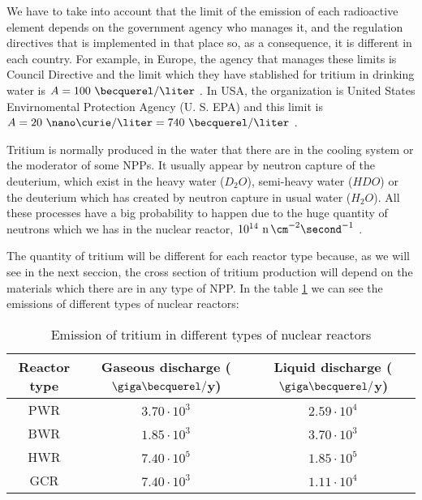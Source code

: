 We have to take into account that the limit of the emission of each radioactive element depends on the government agency who manages it, and the regulation directives that is implemented in that place so, as a consequence, it is different in each country. For example, in Europe, the agency that manages these limits is Council Directive and the limit which they have stablished for tritium in drinking water is $A = 100~\becquerel/\liter$ \cite{100BqL}. In USA, the organization is United States Envirnomental Protection Agency (U. S. EPA) and this limit is $A = 20~\nano\curie/\liter = 740~\becquerel/\liter$ \cite{740BqL}.

Tritium is normally produced in the water that there are in the cooling system or the moderator of some NPPs. It usually appear by neutron capture of the deuterium, which exist in the heavy water ($D_2 O$), semi-heavy water ($H D O$) or the deuterium which has created by neutron capture in usual water ($H_2 O$). All these processes have a big probability to happen due to the huge quantity of neutrons which we has in the nuclear reactor, $10^{14} ~\ce{n} \, \cm^{-2} \second^{-1}$ \cite{CrossSeccionNeutrons}. 

The quantity of tritium will be different for each reactor type because, as we will see in the next seccion, the cross section of tritium production will depend on the materials which there are in any type of NPP. In the table \ref{tab:TritiumEmisionsNPPs} we can see the emissions of different types of nuclear reactors:

\begin{table}[htbp]
\begin{center}
\begin{tabular}{|c|c|c|}
\hline
Reactor type & Gaseous discharge ($\giga\becquerel/$y) & Liquid discharge ($\giga\becquerel/$y) \\
\hline \hline \hline
PWR & $3.70\cdot 10^{3}$ & $2.59\cdot 10^{4}$ \\ \hline
BWR & $1.85\cdot 10^{3}$ & $3.70\cdot 10^{3}$ \\ \hline
HWR & $7.40\cdot 10^{5}$ & $1.85\cdot 10^{5}$ \\ \hline
GCR & $7.40\cdot 10^{3}$ & $1.11\cdot 10^{4}$ \\ \hline
\end{tabular}
\caption{Emission of tritium in different types of nuclear reactors\cite{CommonEmissionTritium}}
\label{tab:TritiumEmisionsNPPs}
\end{center}
\end{table} 

